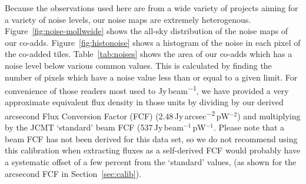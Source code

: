 \documentclass[twocolumn,times]{aastex6}
\newcommand{\jyas}{Jy\,arcsec\textsuperscript{$-$2}}
\begin{document}
Because the observations used here are from a wide variety of projects
aiming for a variety of noise levels, our noise maps are extremely
heterogenous. Figure~\ref{fig:noise-mollweide} shows the all-sky
distribution of the noise maps of our
co-adds. Figure~\ref{fig:histonoise} shows a histogram of the noise in
each pixel of the co-added tiles. Table~\ref{tab:noises} shows the area
of our co-adds which has a noise level below various common
values. This is calculated by finding the number of pixels which have
a noise value less than or equal to a given limit. For convenience of
those readers most used to Jy\,beam\textsuperscript{$-1$}, we have
provided a very approximate equivalent flux density in those units by
dividing by our derived arcsecond Flux Conversion Factor (FCF)
(2.48\,\jyas\,pW$^{-2}$) and multiplying by the JCMT `standard' beam FCF
(537\,Jy\,beam$^{-1}$\,pW$^{-1}$. Please note that a beam FCF has not been
derived for this data set, so we do not recommend using this
calibration when extracting fluxes as a self-derived FCF would
probably have a systematic offset of a few percent from the `standard'
values, (as shown for the arcsecond FCF in Section~\ref{sec:calib}).
\end{document}
